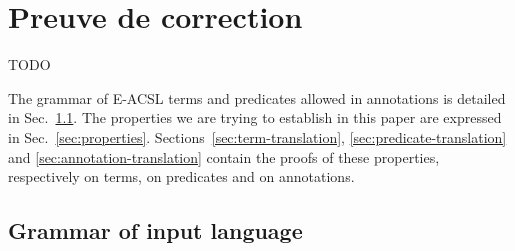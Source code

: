 
\chapter{Preuve de correction}
\label{sec:preuve-correction}


TODO

The grammar of E-ACSL \cite{E-ACSL} terms and predicates allowed in annotations
is detailed in Sec.~\ref{sec:grammar}.
The properties we are trying to establish in this paper are expressed
in Sec.~\ref{sec:properties}.
Sections~\ref{sec:term-translation}, \ref{sec:predicate-translation} and
\ref{sec:annotation-translation} contain the proofs of these properties,
respectively on terms, on predicates and on annotations.


\section{Grammar of input language}
\label{sec:grammar}

